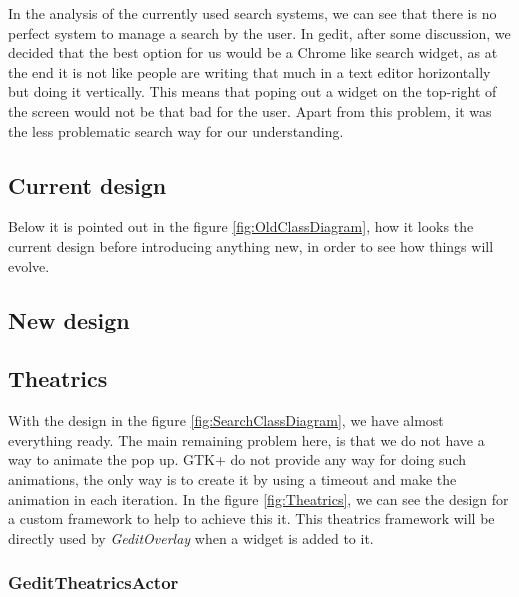 
In the analysis of the currently used search systems, we can see that there is no perfect system to manage a search by the user. In gedit, after some discussion, we decided that the best option for us would be a Chrome like search widget, as at the end it is not like people are writing that much in a text editor horizontally but doing it vertically. This means that poping out a widget on the top-right of the screen would not be that bad for the user. Apart from this problem, it was the less problematic search way for our understanding.

\subsection{Current design}

Below it is pointed out in the figure \ref{fig:OldClassDiagram}, how it looks the current design before introducing anything new, in order to see how things will evolve.


\subsection{New design}

\newpage
{}

\newpage
\subsection{Theatrics}

With the design in the figure \ref{fig:SearchClassDiagram}, we have almost everything ready. The main remaining problem here, is that we do not have a way to animate the pop up. GTK+ do not provide any way for doing such animations, the only way is to create it by using a timeout and make the animation in each iteration. In the figure \ref{fig:Theatrics}, we can see the design for a custom framework to help to achieve this it. This theatrics framework will be directly used by \emph{GeditOverlay} when a widget is added to it.


\subsubsection{GeditTheatricsActor}

